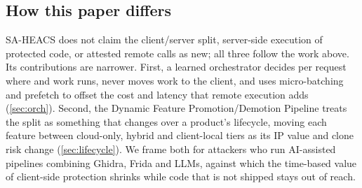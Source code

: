 \subsection{How this paper differs}\label{sec:positioning}
SA-HEACS does not claim the client/server split, server-side execution of protected code,
or attested remote calls as new; all three follow the work above. Its contributions are
narrower. First, a learned orchestrator decides per request where  and
 work runs, never moves  work to the client, and uses
micro-batching and prefetch to offset the cost and latency that remote execution adds
(\cref{sec:orch}). Second, the Dynamic Feature Promotion/Demotion Pipeline treats the split
as something that changes over a product's lifecycle, moving each feature between
cloud-only, hybrid and client-local tiers as its IP value and clone risk change
(\cref{sec:lifecycle}). We frame both for attackers who run AI-assisted pipelines combining
Ghidra, Frida and LLMs, against which the time-based value of client-side protection
shrinks while code that is not shipped stays out of reach.
